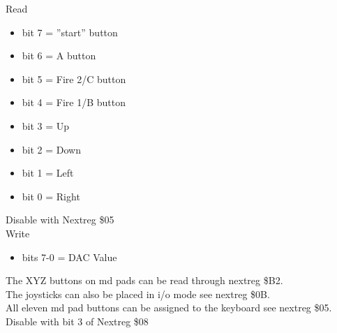 Read
\begin{itemize}
\item[] bit 7 = ''start'' button
\item[] bit 6 = A button
\item[] bit 5 = Fire 2/C button
\item[] bit 4 = Fire 1/B button
\item[] bit 3 = Up
\item[] bit 2 = Down
\item[] bit 1 = Left
\item[] bit 0 = Right
\end{itemize}
Disable with Nextreg \$05\\
Write
\begin{itemize}
\item[] bits 7-0 = DAC Value
\end{itemize}
The XYZ buttons on md pads can be read through nextreg \$B2.\\
The joysticks can also be placed in i/o mode see nextreg \$0B.\\
All eleven md pad buttons can be assigned to the keyboard see nextreg \$05.\\
Disable with bit 3 of Nextreg \$08
